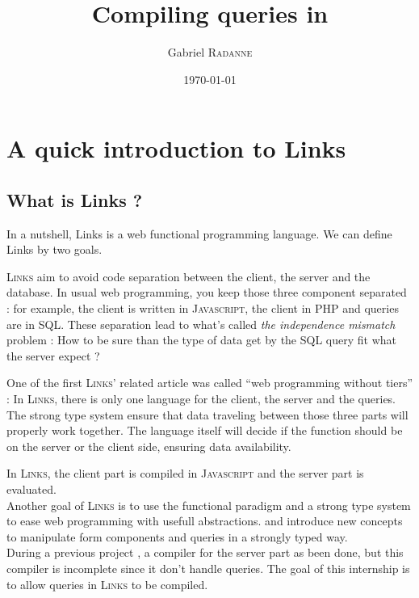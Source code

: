 \documentclass[11pt]{article}
\title{Compiling queries in \links}
\author{Gabriel \textsc{Radanne}}
\date{\today}
\newcommand\mysc[1]{{\rmfamily\textsc{#1}}\xspace}
\newcommand\links{\mysc{Links}}
\newcommand\sql{\mysc{SQL}}
\newcommand\js{\mysc{Javascript}}
\begin{document}
\begin{titlepage}
  \maketitle
  \thispagestyle{empty} %
  
\end{titlepage}



\section{A quick introduction to Links}

\subsection{What is Links ?}
In a nutshell, Links is a web functional programming language. We can define Links by two goals.

\links aim to avoid code separation between the client, the server and the database. In usual web programming, you keep those three component separated : for example, the client is written in \js, the client in \mysc{PHP} and queries are in \sql. 
These separation lead to what's called {\it the independence mismatch} problem : How to be sure than the type of data get by the \sql query fit what the server expect ? 

One of the first \links' related article \cite{links:tiers} was called ``web programming without tiers'' : In \links, there is only one language for the client, the server and the queries. 
The strong type system ensure that data traveling between those three parts will properly work together. 
The language itself will decide if the function should be on the server or the client side, ensuring data availability.

In \links, the client part is compiled in \js and the server part is evaluated.
\\

Another goal of \links is to use the functional paradigm and a strong type system to ease web programming with usefull abstractions. \cite{links:formlets} and \cite{links:effect} introduce new concepts to manipulate form components and queries in a strongly typed way.\\

During a previous project \cite{links:comp}, a compiler for the server part as been done, but this compiler is incomplete since it don't handle queries. The goal of this internship is to allow queries in \links to be compiled.\\
\end{document}
